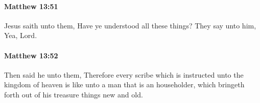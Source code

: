 		\paragraph{Matthew 13:51} %
			\label{MATTHEW-13-51}

			Jesus saith unto them, Have ye understood all these things? They say unto him, Yea, Lord.

			\begin{framed}
			\scriptsize
				\begin{compactdesc}
					\item[SBLG] 
				\end{compactdesc}
			\end{framed}

		\paragraph{Matthew 13:52} %
			\label{MATTHEW-13-52}

			Then said he unto them, Therefore every scribe which is instructed unto the kingdom of heaven is like unto a man that is an householder, which bringeth forth out of his treasure things new and old.

